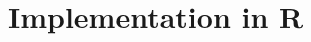 \documentclass[12pt]{article}
\newcommand{\code}[1]{\texttt{#1}}
\begin{document}
\section{Implementation in R}


\end{document}
